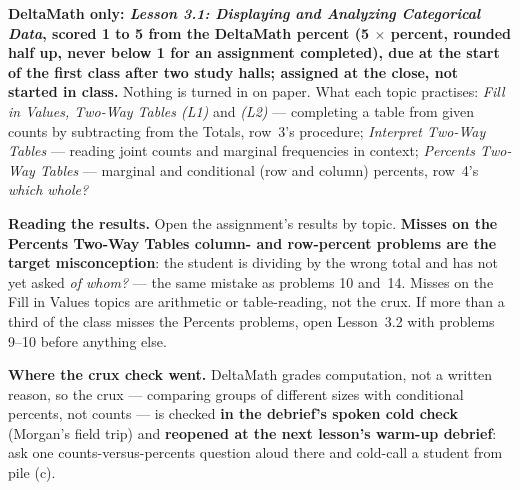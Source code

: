 \documentclass[10pt]{article}
\begin{document}
\begin{teachernote}[Homework]
\textbf{DeltaMath only: \emph{Lesson 3.1: Displaying and Analyzing Categorical Data}, scored 1 to
5 from the DeltaMath percent (5 $\times$ percent, rounded half up, never below 1 for an assignment
completed), due at the start of the first class after two study halls; assigned at the close, not
started in class.} Nothing is turned in on paper. What each topic practises:
\emph{Fill in Values, Two-Way Tables (L1)} and \emph{(L2)} --- completing a table from given
counts by subtracting from the Totals, row~3's procedure; \emph{Interpret Two-Way Tables} ---
reading joint counts and marginal frequencies in context; \emph{Percents Two-Way Tables} ---
marginal and conditional (row and column) percents, row~4's \emph{which whole?}

\textbf{Reading the results.} Open the assignment's results by topic. \textbf{Misses on the
Percents Two-Way Tables column- and row-percent problems are the target misconception}: the
student is dividing by the wrong total and has not yet asked \emph{of whom?} --- the same mistake
as problems 10 and~14. Misses on the Fill in Values topics are arithmetic or table-reading, not the
crux. If more than a third of the class misses the Percents problems, open Lesson~3.2 with
problems 9--10 before anything else.

\textbf{Where the crux check went.} DeltaMath grades computation, not a written reason, so the
crux --- comparing groups of different sizes with conditional percents, not counts --- is checked
\textbf{in the debrief's spoken cold check} (Morgan's field trip) and \textbf{reopened at the next
lesson's warm-up debrief}: ask one counts-versus-percents question aloud there and cold-call a
student from pile (c).
\end{teachernote}
\end{document}
